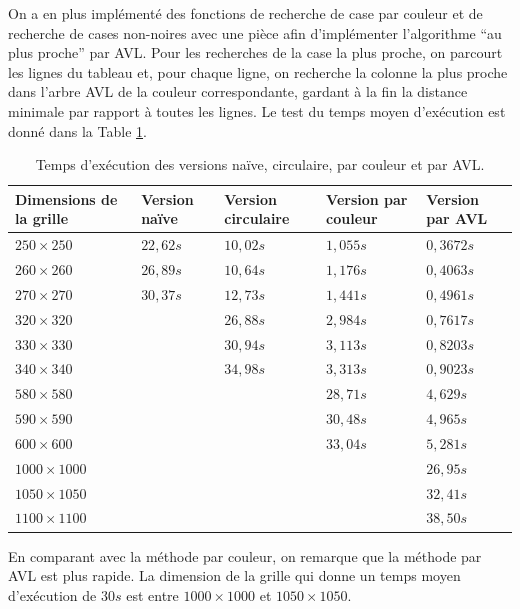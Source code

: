 \documentclass[a4paper,12pt]{article}
\numberwithin{equation}{section}
\begin{document}
On a en plus implémenté des fonctions de recherche de case par couleur et de recherche de cases non-noires avec une pièce afin d'implémenter l'algorithme ``au plus proche'' par AVL. Pour les recherches de la case la plus proche, on parcourt les lignes du tableau \verb@M@ et, pour chaque ligne, on recherche la colonne la plus proche dans l'arbre AVL de la couleur correspondante, gardant à la fin la distance minimale par rapport à toutes les lignes. Le test du temps moyen d'exécution est donné dans la Table \ref{TempsAVL}.

\begin{table}
\centering
\begin{tabular}{>{\centering} m{} >{\centering} m{} >{\centering} m{} >{\centering} m{} >{\centering} m{}}
\hline\hline
Dimensions de la grille & Version naïve & Version circulaire & Version par couleur & Version par AVL \tabularnewline
\hline
$250 \times 250$   & $22,62 s$ & $10,02 s$ & $1,055 s$ & $0,3672 s$ \tabularnewline
$260 \times 260$   & $26,89 s$ & $10,64 s$ & $1,176 s$ & $0,4063 s$ \tabularnewline
$270 \times 270$   & $30,37 s$ & $12,73 s$ & $1,441 s$ & $0,4961 s$ \tabularnewline
$320 \times 320$   &           & $26,88 s$ & $2,984 s$ & $0,7617 s$ \tabularnewline
$330 \times 330$   &           & $30,94 s$ & $3,113 s$ & $0,8203 s$ \tabularnewline
$340 \times 340$   &           & $34,98 s$ & $3,313 s$ & $0,9023 s$ \tabularnewline
$580 \times 580$   &           &           & $28,71 s$ & $4,629 s$  \tabularnewline
$590 \times 590$   &           &           & $30,48 s$ & $4,965 s$  \tabularnewline
$600 \times 600$   &           &           & $33,04 s$ & $5,281 s$  \tabularnewline
$1000 \times 1000$ &           &           &           & $26,95 s$  \tabularnewline
$1050 \times 1050$ &           &           &           & $32,41 s$  \tabularnewline
$1100 \times 1100$ &           &           &           & $38,50 s$  \tabularnewline
\hline\hline
\end{tabular}
\caption{Temps d'exécution des versions naïve, circulaire, par couleur et par AVL.}
\label{TempsAVL}
\end{table}

En comparant avec la méthode par couleur, on remarque que la méthode par AVL est plus rapide. La dimension de la grille qui donne un temps moyen d'exécution de $30 s$ est entre $1000 \times 1000$ et $1050 \times 1050$.
\end{document}
